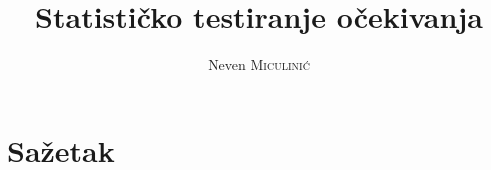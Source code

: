 \documentclass[times, utf8, seminar, numeric]{fer}
\begin{document}
\nocite{*}
\title{Statističko testiranje očekivanja}
\author{Neven \textsc{Miculinić}}

\maketitle

\tableofcontents

\graphicspath{{Pictures/}} 

 







\chapter{Sažetak}
\end{document}
